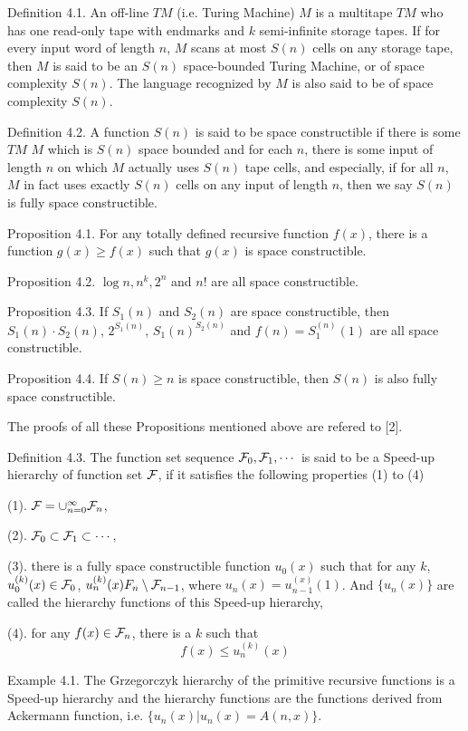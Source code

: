 Definition 4.1. An off-line $TM$ (i.e. Turing Machine) $M$ is a 
multitape $TM$ who has one read-only tape with endmarks and $k$ 
semi-infinite storage tapes. If for every input word of length 
$n$, $M$ scans at most $S(n)$ cells on any storage tape, then $M$ 
is said to be an $S(n)$ space-bounded Turing Machine, or of space 
complexity $S(n)$. The language recognized by $M$ is also said to 
be of space complexity $S(n)$.

Definition 4.2. A function $S(n)$ is said to be space 
constructible if there is some $TM$ $M$ which is $S(n)$ space
bounded and for each $n$, there is some input of length $n$ on 
which $M$ actually uses $S(n)$ tape cells, and especially, if for 
all $n$, $M$ in fact uses exactly $S(n)$ cells on any input of 
length $n$, then we say $S(n)$ is fully space constructible.

Proposition 4.1. For any totally defined recursive function 
$f(x)$, there is a function $g(x)\ge f(x)$ such that $g(x)$ is
space constructible.

Proposition 4.2. $\log n, n^k,2^n$ and $n!$ are all space 
constructible.

Proposition 4.3. If $S_1(n)$ and $S_2(n)$ are space 
constructible, then $S_1(n)\cdot 
S_2(n)$, $2^{S_1(n)}$, $S_1(n)^{S_2(n)}$ and $f(n)=S_1^{(n)}(1)$ are
all space constructible.

Proposition 4.4. If $S(n)\ge n$ is space constructible, then 
$S(n)$ is also fully space constructible.

The proofs of all these Propositions mentioned above are refered 
to [2].

Definition 4.3. The function set sequence ${\cal F}_0,{\cal F}_1,
\cdots$ is said to be a Speed-up hierarchy of function set
${\cal F}$, if it satisfies the following properties (1) to (4)

(1). ${\cal F}=\cup^\infty_{n=0}{\cal F}_n$,

(2). ${\cal F}_0\subset{\cal F}_1\subset\cdots$,

(3). there is a fully space constructible function $u_0(x)$ such
that for any $k$, $u^{(k)}_0(x)\in{\cal F}_0$, $u^{(k)}_n(x)
F_n\setminus{\cal F}_{n-1}$, where $u_n(x)=u^{(x)}_{n-1}(1)$. And 
$\{u_n(x)\}$ are called the hierarchy functions of this Speed-up
hierarchy,

(4). for any $f(x)\in{\cal F}_n$, there is a $k$ such that
$$f(x)\le u^{(k)}_n(x)$$

Example 4.1. The Grzegorczyk hierarchy of the primitive recursive 
functions is a Speed-up hierarchy and the hierarchy functions are 
the functions derived from Ackermann function, i.e. $\{u_n(x)|u_n(x)=A(n,x)\}$.

